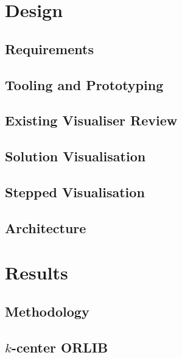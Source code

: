\documentclass{article}
\begin{document}
\newpage
\section{Design}\label{section:design}
    \subsection{Requirements}\label{section:requirements}
    
    
    \subsection{Tooling and Prototyping}\label{section:prototype}
    
    
    \subsection{Existing Visualiser Review}\label{section:visualiser_review}
    
    
    \subsection{Solution Visualisation}\label{section:solution_visualisation}
    
    
    \subsection{Stepped Visualisation}\label{section:stepped_visualisation}
    
    
    \subsection{Architecture}\label{section:architecture}
    

\newpage
\section{Results}\label{section:results}
    \subsection{Methodology}\label{section:methodology}
    
    
    \subsection{\texorpdfstring{$k$}{k}-center ORLIB}\label{section:k_center_orlib}
    
    
\end{document}
